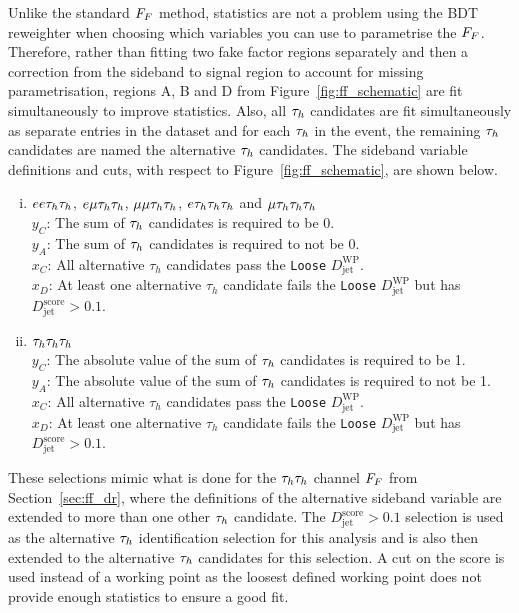 Unlike the standard $F_{F}$ method, statistics are not a problem using the \ac{BDT} reweighter when choosing which variables you can use to parametrise the $F_{F}$. 
Therefore, rather than fitting two fake factor regions separately and then a correction from the sideband to signal region to account for missing parametrisation, regions A, B and D from Figure~\ref{fig:ff_schematic} are fit simultaneously to improve statistics. 
Also, all $\tau_{h}$ candidates are fit simultaneously as separate entries in the dataset and for each $\tau_{h}$ in the event, the remaining $\tau_{h}$ candidates are named the alternative $\tau_{h}$ candidates. 
The sideband variable definitions and cuts, with respect to Figure~\ref{fig:ff_schematic}, are shown below. \\

\begin{enumerate}[i)]
   \item $ee\tau_{h}\tau_{h}$, $e\mu\tau_{h}\tau_{h}$, $\mu\mu\tau_{h}\tau_{h}$, $e\tau_{h}\tau_{h}\tau_{h}$ and $\mu\tau_{h}\tau_{h}\tau_{h}$  \\
     \indent $y_C$: The sum of $\tau_{h}$ candidates is required to be 0. \\
     \indent $y_A$: The sum of $\tau_{h}$ candidates is required to not be 0. \\
     \indent $x_C$: All alternative $\tau_h$ candidates pass the \texttt{Loose} $D_{\text{jet}}^{\text{WP}}$. \\
     \indent $x_D$: At least one alternative $\tau_h$ candidate fails the \texttt{Loose} $D_{\text{jet}}^{\text{WP}}$ but has $D_{\text{jet}}^{\text{score}} > 0.1$.
  \item $\tau_{h}\tau_{h}\tau_{h}$ \\
     \indent $y_C$: The absolute value of the sum of $\tau_{h}$ candidates is required to be 1. \\
     \indent $y_A$: The absolute value of the sum of $\tau_{h}$ candidates is required to not be 1. \\
     \indent $x_C$: All alternative $\tau_h$ candidates pass the \texttt{Loose} $D_{\text{jet}}^{\text{WP}}$. \\
     \indent $x_D$: At least one alternative $\tau_h$ candidate fails the \texttt{Loose} $D_{\text{jet}}^{\text{WP}}$ but has $D_{\text{jet}}^{\text{score}} > 0.1$.
\end{enumerate}

These selections mimic what is done for the $\tau_{h}\tau_{h}$ channel $F_{F}$ from Section~\ref{sec:ff_dr}, where the definitions of the alternative sideband variable are extended to more than one other $\tau_{h}$ candidate.
The $D_{\text{jet}}^{\text{score}} > 0.1$ selection is used as the alternative $\tau_{h}$ identification selection for this analysis and is also then extended to the alternative $\tau_{h}$ candidates for this selection.
A cut on the score is used instead of a working point as the loosest defined working point does not provide enough statistics to ensure a good fit. \\

